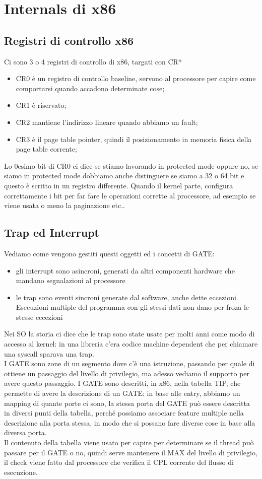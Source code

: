 \documentclass[12pt, oneside]{extbook}
\begin{document}
\section{Internals di x86}
\subsection{Registri di controllo x86}
Ci sono 3 o 4 registri di controllo di x86, targati con CR*
\begin{itemize}
\item CR0 è un registro di controllo baseline, servono al processore per capire come comportarsi quando accadono determinate cose;
\item CR1 è riservato;
\item CR2 mantiene l'indirizzo lineare quando abbiamo un fault;
\item CR3 è il page table pointer, quindi il posizionamento in memoria fisica della page table corrente;
\end{itemize}
Lo 0esimo bit di CR0 ci dice se stiamo lavorando in protected mode oppure no, se siamo in protected mode dobbiamo anche distinguere se siamo a 32 o 64 bit e questo è scritto in un registro differente. Quando il kernel parte, configura correttamente i bit per far fare le operazioni corrette al processore, ad esempio se viene usata o meno la paginazione etc..
\subsection{Trap ed Interrupt}
Vediamo come vengono gestiti questi oggetti ed i concetti di GATE:
\begin{itemize}
\item gli interrupt sono asincroni, generati da altri componenti hardware che mandano segnalazioni al processore
\item le trap sono eventi sincroni generate dal software, anche dette eccezioni. Esecuzioni multiple del programma con gli stessi dati non dano per froza le stesse eccezioni
\end{itemize}
Nei SO la storia ci dice che le trap sono state usate per molti anni come modo di accesso al kernel: in una libreria c'era codice machine dependent che per chiamare una syscall sparava una trap.\\ I GATE sono zone di un segmento dove c'è una istruzione, passando per quale di ottiene un passaggio del livello di privilegio, ma adesso vediamo il supporto per avere questo passaggio. I GATE sono descritti, in x86, nella tabella TIP, che permette di avere la descrizione di un GATE: in base alle entry, abbiamo un mapping di quante porte ci sono, la stessa porta del GATE può essere descritta in diversi punti della tabella, perché possiamo associare feature multiple nella descrizione alla porta stessa, in modo che si possano fare diverse cose in base alla diversa porta.\\ Il contenuto della tabella viene usato per capire per determinare se il thread può passare per il GATE o no, quindi serve mantenere il MAX del livello di privilegio, il check viene fatto dal processore che verifica il CPL corrente del flusso di esecuzione.
\end{document}
